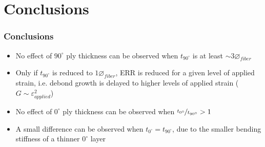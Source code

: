 \documentclass[first,firstsupp,lastsupp,last,hyperref,table]{ETHclass}
\begin{document}
\section{Conclusions}

\begin{frame}
\frametitle{Conclusions}
\vspace{-0.5cm}
\centering
\begin{itemize}[label=]
\item No effect of  $90^{\circ}$ ply thickness can be observed when $t_{90^{\circ}}$ is at least $\sim3\diameter_{fiber}$
\item Only if $t_{90^{\circ}}$ is reduced to $1\diameter_{fiber}$, ERR is reduced for a given level of applied strain, i.e. debond growth is delayed to higher levels of applied strain ($G\sim\varepsilon_{applied}^{2}$)
\item No effect of  $0^{\circ}$ ply thickness can be observed when $\nicefrac{t_{0^{\circ}}}{t_{90^{\circ}}}>1$
\item A small difference can be observed when  $t_{0^{\circ}}=t_{90^{\circ}}$, due to the smaller bending stiffness of a thinner $0^{\circ}$ layer
\end{itemize}
\end{frame}

\begin{frame}[plain]
\frametitle{}
\end{frame}
\end{document}
